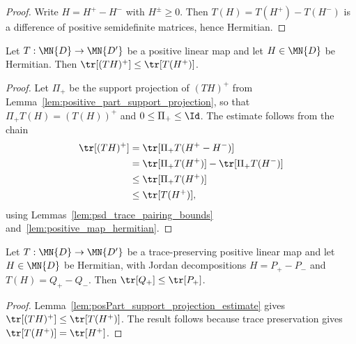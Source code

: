 \begin{proof}\leanok
    Write $H=H^+-H^-$ with $H^\pm\geq0$. Then $T(H)=T(H^+)-T(H^-)$ is a
    difference of positive semidefinite matrices, hence Hermitian.
\end{proof}

\begin{lemma}
    \label{lem:posPart_support_projection_estimate}
    \leanok
    Let $T:\MN{D}\to\MN{D'}$ be a positive linear map and let
    $H\in\MN{D}$ be Hermitian.  Then
    $\tr[(TH)^+]\leq\tr[T(H^+)]$.
\end{lemma}

\begin{proof}\leanok
    Let $\Pi_+$ be the support projection of $(TH)^+$ from
    Lemma~\ref{lem:positive_part_support_projection}, so that
    $\Pi_+ T(H) = (T(H))^+$ and $0\leq\Pi_+\leq\Id$.  The estimate follows
    from the chain
    \begin{align}
        \tr[(TH)^+] & = \tr[\Pi_+ T(H^+-H^-)] \notag                 \\
                    & = \tr[\Pi_+ T(H^+)] - \tr[\Pi_+ T(H^-)] \notag \\
                    & \leq \tr[\Pi_+ T(H^+)] \notag                  \\
                    & \leq \tr[T(H^+)] ,
    \end{align}
    using Lemmas~\ref{lem:psd_trace_pairing_bounds}
    and~\ref{lem:positive_map_hermitian}.
\end{proof}

\begin{lemma}
    \label{lem:positive_part_trace_estimate}
    \leanok
    Let $T:\MN{D}\to\MN{D'}$ be a trace-preserving positive linear map and
    let $H\in\MN{D}$ be Hermitian, with Jordan decompositions $H=P_+-P_-$
    and $T(H)=Q_+-Q_-$. Then $\tr[Q_+]\leq\tr[P_+]$.
\end{lemma}

\begin{proof}\leanok
    Lemma~\ref{lem:posPart_support_projection_estimate} gives
    $\tr[(TH)^+]\leq\tr[T(H^+)]$.  The result follows because
    trace preservation gives $\tr[T(H^+)]=\tr[H^+]$.
\end{proof}


